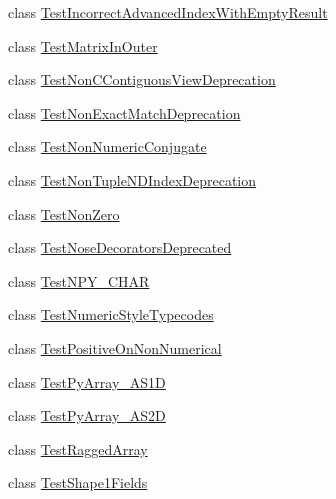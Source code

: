 \begin{DoxyCompactItemize}
\item 
class \hyperlink{classnumpy_1_1core_1_1tests_1_1test__deprecations_1_1TestIncorrectAdvancedIndexWithEmptyResult}{Test\+Incorrect\+Advanced\+Index\+With\+Empty\+Result}
\item 
class \hyperlink{classnumpy_1_1core_1_1tests_1_1test__deprecations_1_1TestMatrixInOuter}{Test\+Matrix\+In\+Outer}
\item 
class \hyperlink{classnumpy_1_1core_1_1tests_1_1test__deprecations_1_1TestNonCContiguousViewDeprecation}{Test\+Non\+C\+Contiguous\+View\+Deprecation}
\item 
class \hyperlink{classnumpy_1_1core_1_1tests_1_1test__deprecations_1_1TestNonExactMatchDeprecation}{Test\+Non\+Exact\+Match\+Deprecation}
\item 
class \hyperlink{classnumpy_1_1core_1_1tests_1_1test__deprecations_1_1TestNonNumericConjugate}{Test\+Non\+Numeric\+Conjugate}
\item 
class \hyperlink{classnumpy_1_1core_1_1tests_1_1test__deprecations_1_1TestNonTupleNDIndexDeprecation}{Test\+Non\+Tuple\+N\+D\+Index\+Deprecation}
\item 
class \hyperlink{classnumpy_1_1core_1_1tests_1_1test__deprecations_1_1TestNonZero}{Test\+Non\+Zero}
\item 
class \hyperlink{classnumpy_1_1core_1_1tests_1_1test__deprecations_1_1TestNoseDecoratorsDeprecated}{Test\+Nose\+Decorators\+Deprecated}
\item 
class \hyperlink{classnumpy_1_1core_1_1tests_1_1test__deprecations_1_1TestNPY__CHAR}{Test\+N\+P\+Y\+\_\+\+C\+H\+AR}
\item 
class \hyperlink{classnumpy_1_1core_1_1tests_1_1test__deprecations_1_1TestNumericStyleTypecodes}{Test\+Numeric\+Style\+Typecodes}
\item 
class \hyperlink{classnumpy_1_1core_1_1tests_1_1test__deprecations_1_1TestPositiveOnNonNumerical}{Test\+Positive\+On\+Non\+Numerical}
\item 
class \hyperlink{classnumpy_1_1core_1_1tests_1_1test__deprecations_1_1TestPyArray__AS1D}{Test\+Py\+Array\+\_\+\+A\+S1D}
\item 
class \hyperlink{classnumpy_1_1core_1_1tests_1_1test__deprecations_1_1TestPyArray__AS2D}{Test\+Py\+Array\+\_\+\+A\+S2D}
\item 
class \hyperlink{classnumpy_1_1core_1_1tests_1_1test__deprecations_1_1TestRaggedArray}{Test\+Ragged\+Array}
\item 
class \hyperlink{classnumpy_1_1core_1_1tests_1_1test__deprecations_1_1TestShape1Fields}{Test\+Shape1\+Fields}

\end{DoxyCompactItemize}
